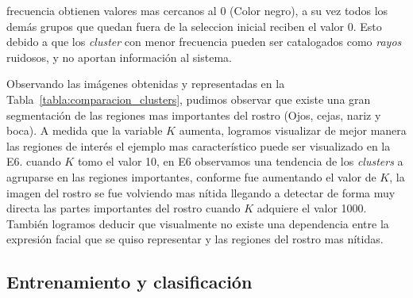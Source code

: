 frecuencia obtienen valores mas cercanos al 0 (Color negro), a su vez todos los demás grupos que quedan fuera de la seleccion inicial reciben el valor 0. Esto debido a que los \textit{cluster} con menor frecuencia pueden ser catalogados como \textit{rayos} ruidosos, y no aportan información al sistema.

Observando las imágenes obtenidas y representadas en la Tabla~\ref{tabla:comparacion_clusters}, pudimos observar que existe una gran segmentación de las regiones mas importantes del rostro (Ojos, cejas, nariz y boca). A medida que la variable $K$ aumenta, logramos visualizar de mejor manera las regiones de interés el ejemplo mas característico puede ser visualizado en la E6. \eg cuando $K$ tomo el valor 10, en E6 observamos una tendencia de los \textit{clusters} a agruparse en las regiones importantes, conforme fue aumentando el valor de $K$, la imagen del rostro se fue volviendo mas nítida llegando a detectar de forma muy directa las partes importantes del rostro cuando $K$ adquiere el valor 1000. También logramos deducir que visualmente no existe una dependencia entre la expresión facial que se quiso representar y las regiones del rostro mas nítidas.





\subsection{ Entrenamiento y clasificación }




%
%
%
